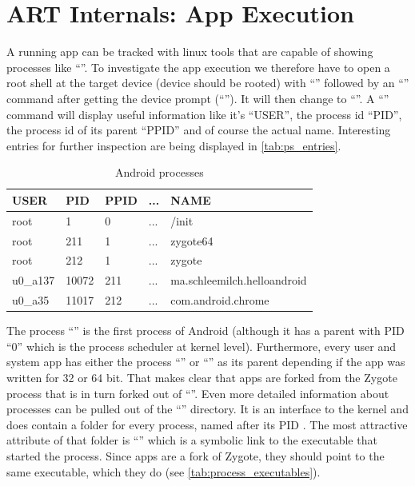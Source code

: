 \chapter{ART Internals: App Execution}
\label{chapter:art_internals_app_execution}

A running app can be tracked with linux tools that are capable
of showing processes like ``''. To investigate the app execution
we therefore have to open a root shell at the target device
(device should be rooted) with ``''
followed by an ``'' command after getting the
device prompt (``''). It will then change
to ``''. A ``'' command will display
useful information like it's ``USER'', the process id ``PID'',
the process id of its parent ``PPID'' and of course the actual name.
Interesting entries for further inspection are being displayed in
\autoref{tab:ps_entries}.

\begin{table}[htb]
  \caption[Android Processes]{Android processes}
  \label{tab:ps_entries}
  \centering
  \begin{tabular}{l l l l l}
    \toprule
      USER & PID & PPID & ... & NAME \\
    \midrule
      root & 1 & 0 & ... & /init \\
      root & 211 & 1 & ... & zygote64 \\
      root & 212 & 1 & ... & zygote \\
      u0\_a137 & 10072 & 211 & ... & ma.schleemilch.helloandroid \\
      u0\_a35 & 11017 & 212 & ... & com.android.chrome \\
    \bottomrule
  \end{tabular}
\end{table}

The process ``'' is the first process of Android (although
it has a parent with PID ``0'' which is the process scheduler at kernel
level).
Furthermore, every user and system app has either the process
``'' or ``'' as its parent depending
if the app was written for 32 or 64 bit. That makes clear that apps
are forked from the Zygote process that is in turn forked out of
``''. Even more detailed information about processes can be
pulled out of the ``'' directory. It is an interface to the
kernel and does contain a folder for every process, named after its PID
\parencite{proc}. The most attractive attribute of that folder is
``'' which is a symbolic link to the executable that started
the process. Since apps are a fork of Zygote, they should point
to the same executable, which they do (see \autoref{tab:process_executables}).

